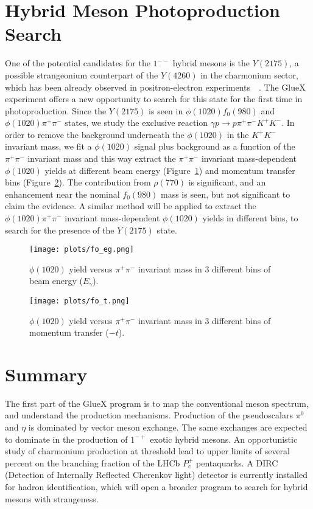 \documentclass[a4paper]{jpconf}
\begin{document}
\section{Hybrid Meson Photoproduction Search}
One of the potential candidates for the $1^{--}$ hybrid mesons is the $Y(2175)$, a possible strangeonium counterpart of the $Y(4260)$ in the charmonium sector, which has been already observed in positron-electron experiments~\cite{ref.6}~\cite{ref.7}. The GlueX experiment offers a new opportunity to search for this state for the first time in photoproduction. Since the $Y(2175)$ is seen in $\phi(1020)f_{0}(980)$ and $\phi(1020)\pi^{+}\pi^{-}$ states, we study the exclusive reaction $\gamma p \rightarrow p \pi^{+}\pi^{-}K^{+}K^{-}$. In order to remove the background underneath the $\phi(1020)$ in the $K^{+}K^{-}$ invariant mass, we fit a $\phi(1020)$ signal plus background as a function of the $\pi^{+}\pi^{-}$ invariant mass and this way extract the $\pi^{+}\pi^{-}$ invariant mass-dependent $\phi(1020)$ yields at different beam energy (Figure~\ref{fig.7}) and momentum transfer bins (Figure~\ref{fig.8}). The contribution from $\rho(770)$ is significant, and an enhancement near the nominal $f_{0}(980)$ mass is seen, but not significant to claim the evidence. A similar method will be applied to extract the $\phi(1020)\pi^{+}\pi^{-}$ invariant mass-dependent $\phi(1020)$ yields in different bins, to search for the presence of the $Y(2175)$ state.

\begin{figure}[h]
    \centering
    \texttt{[image: plots/fo\_eg.png]}
    \caption{\label{fig.7}$\phi(1020)$ yield versus $\pi^{+}\pi^{-}$ invariant mass in 3 different bins of beam energy ($E_{\gamma}$).}
\end{figure}

\begin{figure}[h]
    \centering
    \texttt{[image: plots/fo\_t.png]}
    \caption{\label{fig.8}$\phi(1020)$ yield versus $\pi^{+}\pi^{-}$ invariant mass in 3 different bins of momentum transfer ($-t$).}
\end{figure}

\section{Summary}
The first part of the GlueX program is to map the conventional meson spectrum, and understand the production mechanisms. Production of the pseudoscalars $\pi^{0}$ and $\eta$ is dominated by vector meson exchange. The same exchanges are expected to dominate in the production of $1^{-+}$ exotic hybrid mesons. An opportunistic study of charmonium production at threshold lead to upper limits of several percent on the branching fraction of the LHCb $P^{+}_{c}$ pentaquarks. A DIRC (Detection of Internally Reflected Cherenkov light) detector is currently installed for hadron identification, which will open a broader program to search for hybrid mesons with strangeness.
\end{document}
